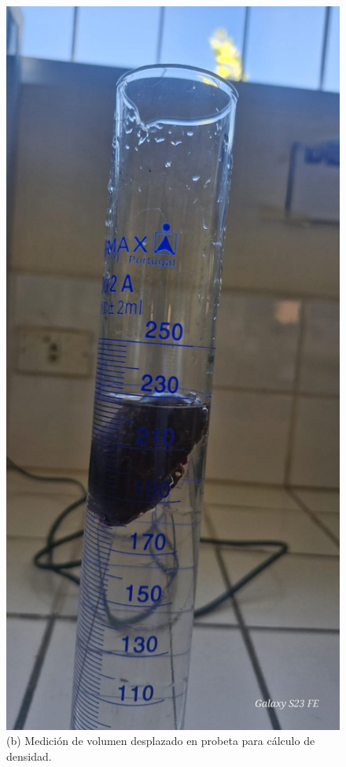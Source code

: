 \documentclass[manuscript,screen,review]{acmart}
\begin{document}
\begin{figure}[H]
\begin{minipage}{0.2\linewidth}
    \includegraphics[width=\linewidth]{imagen/densidad.jpeg}
    \small (b) Medición de volumen desplazado en probeta para cálculo de densidad.
  \end{minipage}


\end{figure}
\end{document}
